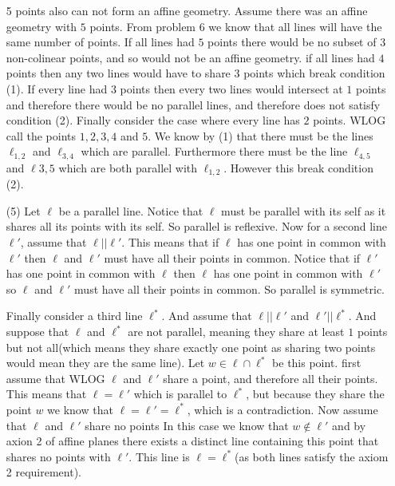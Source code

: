 \documentclass[12pt]{amsart}
\theoremstyle{definition}
\begin{document}
\begin{itemize}
5 points also can not form an affine geometry. Assume there was an affine geometry with $5$ points. From problem $6$ we know that all lines will have the same number of points. If all lines had $5$ points there would be no subset of $3$ non-colinear points, and so would not be an affine geometry. if all lines had $4$ points then any two lines would have to share $3$ points which break condition (1). If every line had $3$ points then every two lines would intersect at $1$ points and therefore there would be no parallel lines, and therefore does not satisfy condition (2). Finally consider the case where every line has $2$ points. WLOG call the points $1,2,3,4$ and $5$. We know by (1) that there must be the lines $\ell_{1,2}$ and $\ell_{3,4}$ which are parallel. Furthermore there must be the line $\ell_{4,5}$ and $\ell{3,5}$ which are both parallel with $\ell_{1,2}$. However this break condition (2).\\

\item[(5)] Let $\ell$ be a parallel line. Notice that $\ell$ must be parallel with its self as it shares all its points with its self. So parallel is reflexive. Now for a second line $\ell'$, assume that $\ell||\ell'$. This means that if $\ell$ has one point in common with $\ell'$ then $\ell$ and $\ell'$ must have all their points in common. Notice that if $\ell'$ has one point in common with $\ell$ then $\ell$ has one point in common with $\ell'$ so $\ell$ and $\ell'$ must have all their points in common. So parallel is symmetric.

Finally consider a third line $\ell^*$. And assume that $\ell||\ell'$ and $\ell'||\ell^*$. And suppose that $\ell$ and $\ell^*$ are not parallel, meaning they share at least $1$ points but not all(which means they share exactly one point as sharing two points would mean they are the same line). Let $w\in \ell\cap\ell^*$ be this point. first assume that WLOG $\ell$ and $\ell'$ share a point, and therefore all their points. This means that $\ell=\ell'$ which is parallel to $\ell^*$, but because they share the point $w$ we know that $\ell=\ell'=\ell^*$, which is a contradiction. Now assume that $\ell$ and $\ell'$ share no points In this case we know that $w\not\in \ell'$ and by axion 2 of affine planes there exists a distinct line containing this point that shares no points with $\ell'$. This line is $\ell=\ell^*$(as both lines satisfy the axiom 2 requirement).\\


\end{itemize}
\end{document}
